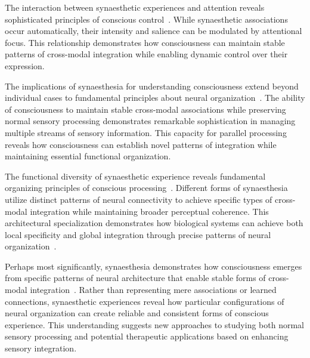 The interaction between synaesthetic experiences and attention reveals sophisticated principles of conscious control~\cite{Mattingley2001, hunt2024electromagnetic}. While synaesthetic associations occur automatically, their intensity and salience can be modulated by attentional focus. This relationship demonstrates how consciousness can maintain stable patterns of cross-modal integration while enabling dynamic control over their expression.

The implications of synaesthesia for understanding consciousness extend beyond individual cases to fundamental principles about neural organization~\cite{Ramachandran2001, pinotsis2023cytoelectric}. The ability of consciousness to maintain stable cross-modal associations while preserving normal sensory processing demonstrates remarkable sophistication in managing multiple streams of sensory information. This capacity for parallel processing reveals how consciousness can establish novel patterns of integration while maintaining essential functional organization.

The functional diversity of synaesthetic experience reveals fundamental organizing principles of conscious processing~\cite{Grossenbacher2001, zheng2025unbearable}. Different forms of synaesthesia utilize distinct patterns of neural connectivity to achieve specific types of cross-modal integration while maintaining broader perceptual coherence. This architectural specialization demonstrates how biological systems can achieve both local specificity and global integration through precise patterns of neural organization~\cite{Ward2013, van2025processes}.

Perhaps most significantly, synaesthesia demonstrates how consciousness emerges from specific patterns of neural architecture that enable stable forms of cross-modal integration~\cite{Hubbard2005, da2024mathematical}. Rather than representing mere associations or learned connections, synaesthetic experiences reveal how particular configurations of neural organization can create reliable and consistent forms of conscious experience. This understanding suggests new approaches to studying both normal sensory processing and potential therapeutic applications based on enhancing sensory integration.


